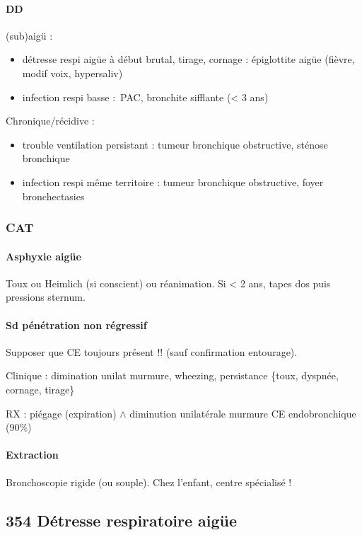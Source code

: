 \documentclass[11pt]{article}
\begin{document}
\paragraph{DD}
\label{sec:orgebbe782}
(sub)aigü : 

\begin{itemize}
\item détresse respi aigüe à début brutal, tirage, cornage : épiglottite aigüe
(fièvre, modif voix, hypersaliv)
\item infection respi basse : PAC, bronchite sifflante (< 3 ans)
\end{itemize}

Chronique/récidive :

\begin{itemize}
\item trouble ventilation persistant : tumeur bronchique obstructive, sténose
bronchique
\item infection respi même territoire : tumeur bronchique obstructive, foyer
bronchectasies
\end{itemize}


\subsubsection{CAT}
\label{sec:org62107e4}
\paragraph{Asphyxie aigüe}
\label{sec:org44c274d}
Toux ou Heimlich (si conscient) ou réanimation. Si < 2 ans, tapes dos puis
pressions sternum.
\paragraph{Sd pénétration non régressif}
\label{sec:org41716fe}
Supposer que CE toujours présent !! (sauf confirmation entourage). 

Clinique : dimination unilat murmure, wheezing, persistance \{toux, dyspnée,
  cornage, tirage\}

RX  : piégage (expiration) \(\wedge\) diminution unilatérale murmure \thus CE
endobronchique (90\%)

\paragraph{Extraction}
\label{sec:org3c16d8f}
Bronchoscopie rigide (ou souple). Chez l'enfant, centre spécialisé !

\subsection{354 \textdagger{} Détresse respiratoire aigüe}
\label{sec:org7787a60}
\label{orge0466e4}
\end{document}
